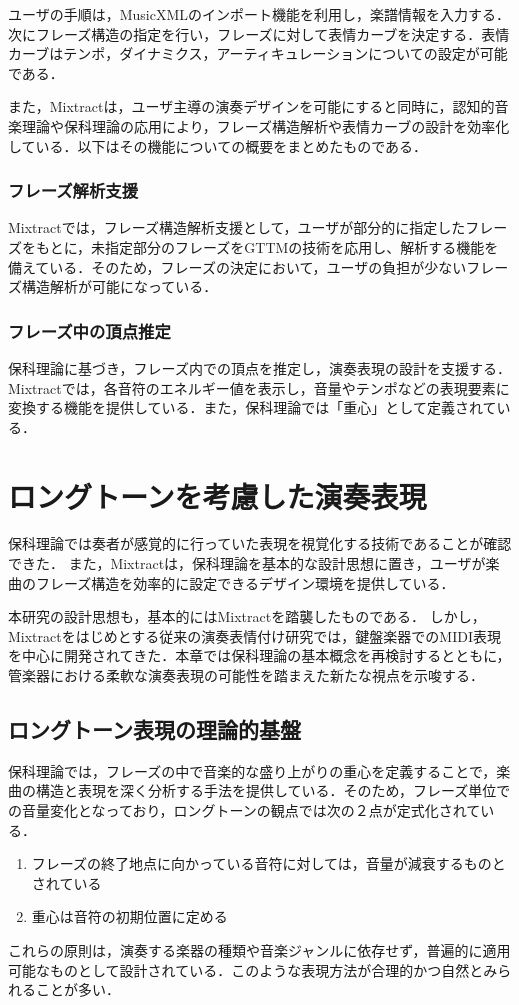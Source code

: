ユーザの手順は，MusicXMLのインポート機能を利用し，楽譜情報を入力する．次にフレーズ構造の指定を行い，フレーズに対して表情カーブを決定する．表情カーブはテンポ，ダイナミクス，アーティキュレーションについての設定が可能である．

また，Mixtractは，ユーザ主導の演奏デザインを可能にすると同時に，認知的音楽理論や保科理論の応用により，フレーズ構造解析や表情カーブの設計を効率化している．以下はその機能についての概要をまとめたものである．

\subsubsection{フレーズ解析支援}
Mixtractでは，フレーズ構造解析支援として，ユーザが部分的に指定したフレーズをもとに，未指定部分のフレーズをGTTMの技術を応用し、解析する機能を備えている．そのため，フレーズの決定において，ユーザの負担が少ないフレーズ構造解析が可能になっている．
\subsubsection{フレーズ中の頂点推定}
保科理論に基づき，フレーズ内での頂点を推定し，演奏表現の設計を支援する．Mixtractでは，各音符のエネルギー値を表示し，音量やテンポなどの表現要素に変換する機能を提供している．また，保科理論では「重心」として定義されている．

\section{ロングトーンを考慮した演奏表現}
保科理論では奏者が感覚的に行っていた表現を視覚化する技術であることが確認できた．
また，Mixtractは，保科理論を基本的な設計思想に置き，ユーザが楽曲のフレーズ構造を効率的に設定できるデザイン環境を提供している．

本研究の設計思想も，基本的にはMixtractを踏襲したものである．
しかし，Mixtractをはじめとする従来の演奏表情付け研究では，鍵盤楽器でのMIDI表現を中心に開発されてきた．本章では保科理論の基本概念を再検討するとともに，管楽器における柔軟な演奏表現の可能性を踏まえた新たな視点を示唆する．
\subsection{ロングトーン表現の理論的基盤}
保科理論では，フレーズの中で音楽的な盛り上がりの重心を定義することで，楽曲の構造と表現を深く分析する手法を提供している．そのため，フレーズ単位での音量変化となっており，ロングトーンの観点では次の２点が定式化されている．

\begin{enumerate}
	\item フレーズの終了地点に向かっている音符に対しては，音量が減衰するものとされている
	\item 重心は音符の初期位置に定める
\end{enumerate}
これらの原則は，演奏する楽器の種類や音楽ジャンルに依存せず，普遍的に適用可能なものとして設計されている．このような表現方法が合理的かつ自然とみられることが多い．

